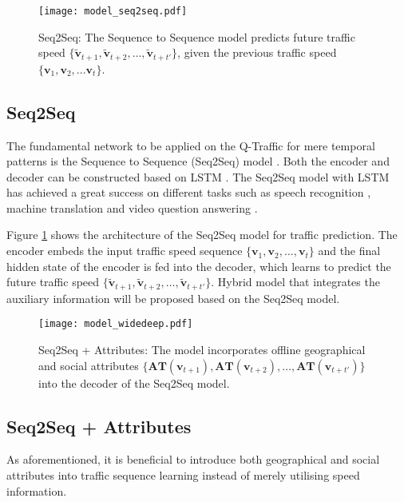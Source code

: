 \begin{figure}[htbp]
\centering
{\texttt{[image: model\_seq2seq.pdf]}}
\caption{Seq2Seq: The Sequence to Sequence model predicts future traffic speed $\{ \tilde{\bm{v}}_{t+1}, \tilde{\bm{v}}_{t+2}, \dots, \tilde{\bm{v}}_{t+t'} \}$, given the previous traffic speed $\{ \bm{v}_{1}, \bm{v}_{2}, ... \bm{v}_{t} \}$. } 
\label{fig:model_seq2seq}
\end{figure}

\subsection{Seq2Seq}

The fundamental network to be applied on the Q-Traffic for mere temporal patterns is the Sequence to Sequence (Seq2Seq) model \cite{cho2014learning,sutskever2014sequence}. Both the encoder and decoder can be constructed based on LSTM \cite{hochreiter1997long}. The Seq2Seq model with LSTM has achieved a great success on different tasks such as speech recognition  \cite{graves2014towards}, machine translation  \cite{sutskever2014sequence} and video question answering  \cite{venugopalan2015sequence}. 

Figure \ref{fig:model_seq2seq} shows the architecture of the Seq2Seq model for traffic prediction. The encoder embeds the input traffic speed sequence $\{\bm{v}_{1}, \bm{v}_{2}, \dots, \bm{v}_{t}\}$ and the final hidden state of the encoder is fed into the decoder, which learns to predict the future traffic speed $\{\tilde{\bm{v}}_{t+1}, \tilde{\bm{v}}_{t+2}, \dots, \tilde{\bm{v}}_{t+t'}\}$. Hybrid model that integrates the auxiliary information will be proposed based on the Seq2Seq model.

\begin{figure}[htbp]
\centering
\texttt{[image: model\_widedeep.pdf]}
\caption{Seq2Seq + Attributes: The model incorporates offline geographical and social attributes $\{\bm{AT} (\bm{v}_{t+1}), \bm{AT} (\bm{v}_{t+2}), \dots, \bm{AT} (\bm{v}_{t+t'}) \}$ into the decoder of the Seq2Seq model.}
\label{fig:model_widedeep}
\end{figure}

\subsection{Seq2Seq + Attributes}

As aforementioned, it is beneficial to introduce both geographical and social attributes into traffic sequence learning instead of merely utilising speed information. 

